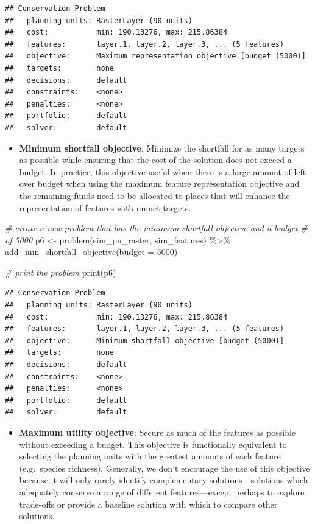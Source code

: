 \documentclass[
  12pt,
]{book}
\newenvironment{Shaded}{\begin{snugshade}}{\end{snugshade}}
\newcommand{\AttributeTok}[1]{\textcolor[rgb]{0.77,0.63,0.00}{#1}}
\newcommand{\CommentTok}[1]{\textcolor[rgb]{0.56,0.35,0.01}{\textit{#1}}}
\newcommand{\DecValTok}[1]{\textcolor[rgb]{0.00,0.00,0.81}{#1}}
\newcommand{\FunctionTok}[1]{\textcolor[rgb]{0.00,0.00,0.00}{#1}}
\newcommand{\NormalTok}[1]{#1}
\newcommand{\OtherTok}[1]{\textcolor[rgb]{0.56,0.35,0.01}{#1}}
\newcommand{\SpecialCharTok}[1]{\textcolor[rgb]{0.00,0.00,0.00}{#1}}
\providecommand{\tightlist}{%
  \setlength{\itemsep}{0pt}\setlength{\parskip}{0pt}}
\begin{document}
\begin{verbatim}
## Conservation Problem
##   planning units: RasterLayer (90 units)
##   cost:           min: 190.13276, max: 215.86384
##   features:       layer.1, layer.2, layer.3, ... (5 features)
##   objective:      Maximum representation objective [budget (5000)]
##   targets:        none
##   decisions:      default
##   constraints:    <none>
##   penalties:      <none>
##   portfolio:      default
##   solver:         default
\end{verbatim}

\begin{itemize}
\tightlist
\item
  \textbf{Minimum shortfall objective}: Minimize the shortfall for as many targets as possible while ensuring that the cost of the solution does not exceed a budget. In practice, this objective useful when there is a large amount of left-over budget when using the maximum feature representation objective and the remaining funds need to be allocated to places that will enhance the representation of features with unmet targets.
\end{itemize}

\begin{Shaded}
\begin{Highlighting}[]
\CommentTok{\# create a new problem that has the minimum shortfall objective and a budget}
\CommentTok{\# of 5000}
\NormalTok{p6 }\OtherTok{\textless{}{-}} \FunctionTok{problem}\NormalTok{(sim\_pu\_raster, sim\_features) }\SpecialCharTok{\%\textgreater{}\%}
  \FunctionTok{add\_min\_shortfall\_objective}\NormalTok{(}\AttributeTok{budget =} \DecValTok{5000}\NormalTok{)}

\CommentTok{\# print the problem}
\FunctionTok{print}\NormalTok{(p6)}
\end{Highlighting}
\end{Shaded}

\begin{verbatim}
## Conservation Problem
##   planning units: RasterLayer (90 units)
##   cost:           min: 190.13276, max: 215.86384
##   features:       layer.1, layer.2, layer.3, ... (5 features)
##   objective:      Minimum shortfall objective [budget (5000)]
##   targets:        none
##   decisions:      default
##   constraints:    <none>
##   penalties:      <none>
##   portfolio:      default
##   solver:         default
\end{verbatim}

\begin{itemize}
\tightlist
\item
  \textbf{Maximum utility objective}: Secure as much of the features as possible without exceeding a budget. This objective is functionally equivalent to selecting the planning units with the greatest amounts of each feature (e.g.~species richness). Generally, we don't encourage the use of this objective because it will only rarely identify complementary solutions---solutions which adequately conserve a range of different features---except perhaps to explore trade-offs or provide a baseline solution with which to compare other solutions.
\end{itemize}
\end{document}
